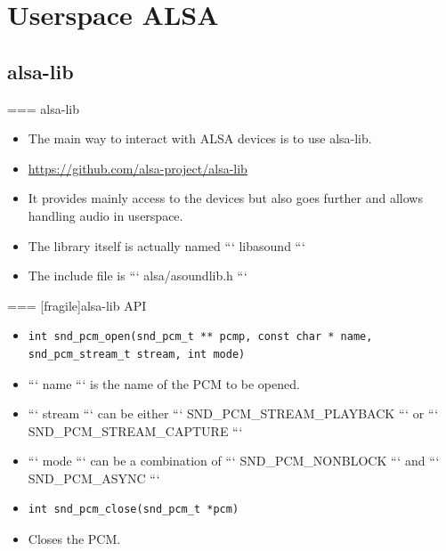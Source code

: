 \section{Userspace ALSA}

\subsection{alsa-lib}

=== {alsa-lib}
  \begin{itemize}
  \item The main way to interact with ALSA devices is to use alsa-lib.
  \item \url{https://github.com/alsa-project/alsa-lib}
  \item It provides mainly access to the devices but also goes further
    and allows handling audio in userspace.
  \item The library itself is actually named ``` libasound ```
  \item The include file is ``` alsa/asoundlib.h ```
  \end{itemize}


=== [fragile]{alsa-lib API}
  \begin{itemize}
  \item 
    \begin{block}{}
    \fontsize{9}{9}\selectfont
      \begin{verbatim}
int snd_pcm_open(snd_pcm_t ** pcmp, const char * name, snd_pcm_stream_t stream, int mode)
      \end{verbatim}
    \end{block}
  \item ``` name ``` is the name of the PCM to be opened.
  \item ``` stream ``` can be either ``` SND_PCM_STREAM_PLAYBACK ``` or
    ``` SND_PCM_STREAM_CAPTURE ```
  \item ``` mode ``` can be a combination of ``` SND_PCM_NONBLOCK ```
    and ``` SND_PCM_ASYNC ```
  \item 
    \begin{block}{}
    \fontsize{9}{9}\selectfont
      \begin{verbatim}
int snd_pcm_close(snd_pcm_t *pcm)
      \end{verbatim}
    \end{block}
  \item Closes the PCM.
  \end{itemize}


